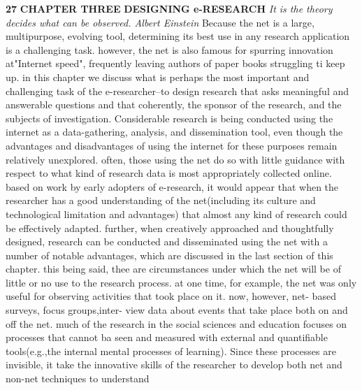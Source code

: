 \documentclass{book}
\begin{document}
\begin{flushleft}
\texttt{}
\hspace*{0.5cm}
\textbf{27}
\vspace*{0.7cm}
\textbf{CHAPTER THREE}
\textbf{DESIGNING e-RESEARCH}
\emph{It is the theory decides what can be observed.
Albert Einstein }
Because the net is a large, multipurpose, evolving tool, determining its best use in
any research application is a challenging task. however, the net is also famous for
spurring innovation at"Internet speed", frequently leaving authors of paper books
struggling ti keep up. in this chapter we discuss what is perhaps the most important
and challenging task of the e-researcher--to design research that asks  meaningful and
answerable questions and that coherently, the sponsor of the research, and the subjects
of investigation.
Considerable research is being conducted using the internet as a data-gathering,
analysis, and dissemination tool, even though the advantages and disadvantages of
using the internet for these purposes remain relatively unexplored. often, those using
the net do so with little guidance with respect to what kind of research data is most
appropriately collected online. based on work by early adopters of e-research, it would
appear that when the researcher has a good understanding of the net(including its culture
and technological limitation and advantages) that almost any kind of research
could be effectively adapted. further, when creatively approached and thoughtfully
designed, research can be conducted and disseminated using the net with a number of
notable advantages, which are discussed in the last section of this chapter. this being
said, thee are circumstances under which the net will be of little or no use to the
research process. at one time, for example, the net was only useful for observing
activities that took place on it. now, however, net- based surveys, focus groups,inter-
view data about events that take place both on and off the net.
much of the research in the social sciences and education focuses on processes
that cannot ba seen and measured with external and quantifiable tools(e.g.,the internal
mental processes of learning). Since these processes are invisible, it take the innovative
skills of the researcher to develop both net and non-net techniques to understand

\end{flushleft}
\end{document}
